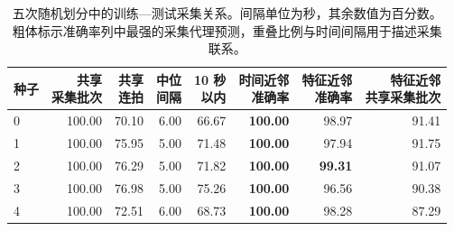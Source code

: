 \begin{table}[htbp]
\centering\small
\caption{五次随机划分中的训练—测试采集关系。间隔单位为秒，其余数值为百分数。粗体标示准确率列中最强的采集代理预测，重叠比例与时间间隔用于描述采集联系。}
\label{tab:leak}
\begin{adjustbox}{max width=\linewidth}
\begin{tabular}{lrrrrrrr}
\toprule
种子 & \makecell{共享\\采集批次} & \makecell{共享\\连拍} & \makecell{中位\\间隔} & \makecell{10 秒\\以内} & \makecell{时间近邻\\准确率} & \makecell{特征近邻\\准确率} & \makecell{特征近邻\\共享采集批次}\\
\midrule
0 & 100.00 & 70.10 & 6.00 & 66.67 & \textbf{100.00} & 98.97 & 91.41\\
1 & 100.00 & 75.95 & 5.00 & 71.48 & \textbf{100.00} & 97.94 & 91.75\\
2 & 100.00 & 76.29 & 5.00 & 71.82 & \textbf{100.00} & \textbf{99.31} & 91.07\\
3 & 100.00 & 76.98 & 5.00 & 75.26 & \textbf{100.00} & 96.56 & 90.38\\
4 & 100.00 & 72.51 & 6.00 & 68.73 & \textbf{100.00} & 98.28 & 87.29\\
\bottomrule
\end{tabular}
\end{adjustbox}
\end{table}
